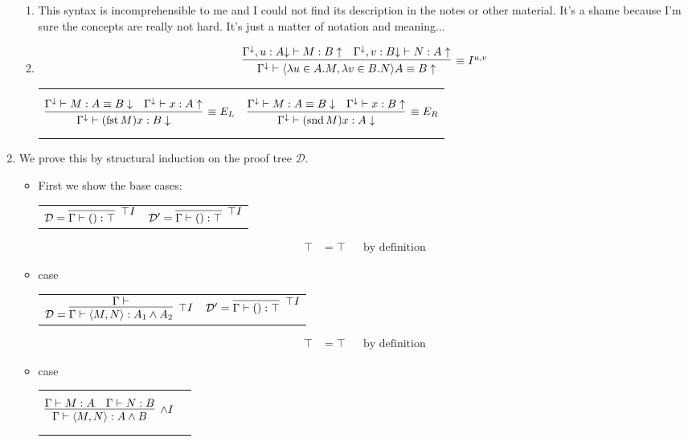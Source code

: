 \documentclass{article}
\newcommand{\D}{\mathcal{D}}
\DeclareMathOperator{\fst}{fst}
\DeclareMathOperator{\snd}{snd}
\begin{document}
\begin{enumerate}[label=\textbf{Exercise \arabic*}]
\begin{enumerate}[label=\textbf{Task \arabic*},leftmargin=1em]
\item This syntax is incomprehensible to me and I could not find its description in the notes or other material. It's a shame because I'm sure the concepts are really not hard. It's just a matter of notation and meaning...
\item 
\[
\infer[\equiv I^{u,v}]
  {\Gamma^\downarrow \vdash \langle \lambda u \in A.M,\lambda v \in B.N \rangle A \equiv B \uparrow}
  {\Gamma^\downarrow, u:A {\downarrow} \vdash M:B \uparrow
  &\Gamma^\downarrow, v:B {\downarrow} \vdash N:A \uparrow}
\]
\begin{tabular}{cc}
$$
\infer[\equiv E_L]
  { \Gamma^\downarrow \vdash (\fst M) x : B \downarrow }
  { \Gamma^\downarrow \vdash M:A \equiv B \downarrow
  & \Gamma^\downarrow \vdash x : A \uparrow }
$$
&
$$
\infer[\equiv E_R]
  { \Gamma^\downarrow \vdash (\snd M) x : A \downarrow }
  { \Gamma^\downarrow \vdash M:A \equiv B \downarrow
  & \Gamma^\downarrow \vdash x : B \uparrow }
$$
\end{tabular}

\end{enumerate}

\item We prove this by structural induction on the proof tree $\mathcal{D}$.

\begin{itemize}
\item First we show the base cases:
\begin{tabular}{cc}
$\D = \infer[\top I]{\Gamma \vdash () : \top}{}$
&
$\D' = \infer[\top I]{\Gamma \vdash () : \top}{}$
\end{tabular}
\begin{align*}
\top &= \top && \text{by definition}
\end{align*}

\item case
\begin{tabular}{cc}
$\D = \infer[\top I]
  {\Gamma \vdash \langle M,N \rangle : A_1 \land A_2}
  {\Gamma \vdash }$
&
$\D' = \infer[\top I]{\Gamma \vdash () : \top}{}$
\end{tabular}
\begin{align*}
\top &= \top && \text{by definition}
\end{align*}

\item case %
\begin{tabular}{cc}
$$
\infer[\land I]
  {\Gamma \vdash \langle M,N \rangle : A\land B}
  {\Gamma \vdash M:A & \Gamma \vdash N:B}
$$
&$$
$$
\end{tabular}
\end{itemize}


\end{enumerate}
\end{document}
